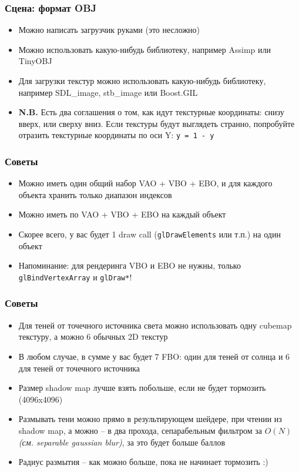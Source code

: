 \documentclass[10pt]{beamer}
\begin{document}
\begin{frame}[fragile]
\frametitle{Сцена: формат OBJ}
\begin{itemize}
\item Можно написать загрузчик руками (это несложно)
\item Можно использовать какую-нибудь библиотеку, например Assimp или TinyOBJ
\item Для загрузки текстур можно использовать какую-нибудь библиотеку, например SDL\_image, stb\_image или Boost.GIL
\item \textbf{N.B.} Есть два соглашения о том, как идут текстурные координаты: снизу вверх, или сверху вниз. Если текстуры будут выглядеть странно, попробуйте отразить текстурные координаты по оси Y: \verb|y = 1 - y|
\end{itemize}
\end{frame}

\begin{frame}[fragile]
\frametitle{Советы}
\begin{itemize}
\item Можно иметь один общий набор VAO + VBO + EBO, и для каждого объекта хранить только диапазон индексов
\item Можно иметь по VAO + VBO + EBO на каждый объект
\item Скорее всего, у вас будет 1 draw call (\verb|glDrawElements| или т.п.) на один объект
\item Напоминание: для рендеринга VBO и EBO не нужны, только \verb|glBindVertexArray| и \verb|glDraw*|!
\end{itemize}
\end{frame}

\begin{frame}[fragile]
\frametitle{Советы}
\begin{itemize}
\item Для теней от точечного источника света можно использовать одну cubemap текстуру, а можно 6 обычных 2D текстур
\item В любом случае, в сумме у вас будет 7 FBO: один для теней от солнца и 6 для теней от точечного источника
\item Размер shadow map лучше взять побольше, если не будет тормозить (4096x4096)
\item Размывать тени можно прямо в результирующем шейдере, при чтении из shadow map, а можно -- в два прохода, сепарабельным фильтром за \begin{math}O(N)\end{math} \textit{(см. separable gaussian blur)}, за это будет больше баллов
\item Радиус размытия -- как можно больше, пока не начинает тормозить :)
\end{itemize}
\end{frame}
\end{document}
